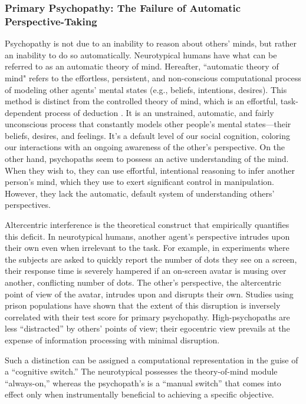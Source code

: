 \documentclass{article}
\begin{document}
\subsubsection{Primary Psychopathy: The Failure of Automatic Perspective-Taking}
Psychopathy is not due to an inability to reason about others' minds, but rather an inability to do so automatically. Neurotypical humans have what can be referred to as an automatic theory of mind. Hereafter, “automatic theory of mind" refers to the effortless, persistent, and non-conscious computational process of modeling other agents' mental states (e.g., beliefs, intentions, desires). This method is distinct from the controlled theory of mind, which is an effortful, task-dependent process of deduction \citep{ref4}. It is an unstrained, automatic, and fairly unconscious process that constantly models other people's mental states—their beliefs, desires, and feelings. It's a default level of our social cognition, coloring our interactions with an ongoing awareness of the other's perspective. On the other hand, psychopaths seem to possess an active understanding of the mind. When they wish to, they can use effortful, intentional reasoning to infer another person's mind, which they use to exert significant control in manipulation. However, they lack the automatic, default system of understanding others' perspectives.

Altercentric interference is the theoretical construct that empirically quantifies this deficit. In neurotypical humans, another agent's perspective intrudes upon their own even when irrelevant to the task. For example, in experiments where the subjects are asked to quickly report the number of dots they see on a screen, their response time is severely hampered if an on-screen avatar is musing over another, conflicting number of dots. The other's perspective, the altercentric point of view of the avatar, intrudes upon and disrupts their own. Studies using prison populations have shown that the extent of this disruption is inversely correlated with their test score for primary psychopathy. High-psychopaths are less “distracted” by others' points of view; their egocentric view prevails at the expense of information processing with minimal disruption.

Such a distinction can be assigned a computational representation in the guise of a “cognitive switch.” The neurotypical possesses the theory-of-mind module “always-on,” whereas the psychopath's is a “manual switch” that comes into effect only when instrumentally beneficial to achieving a specific objective.
\end{document}
